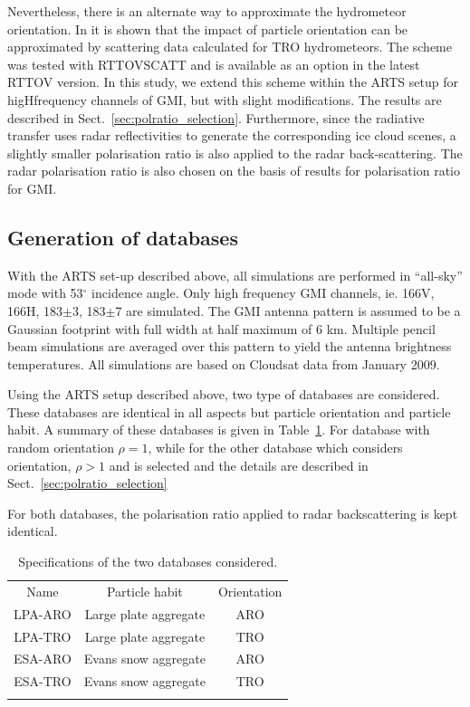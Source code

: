 \documentclass[amt, manuscript]{copernicus}
\begin{document}
Nevertheless, there is an alternate way to approximate the hydrometeor orientation. In \citet{barlakas:intro:21} it is shown that the impact of particle orientation can be approximated by scattering data calculated for TRO hydrometeors. The scheme was tested with RTTOVSCATT \citep{saunders:rttov:18} and is available as an option in the latest RTTOV version. In this study, we extend this scheme within the ARTS setup for higHfrequency channels of GMI, but with slight modifications. The results are described in Sect.~\ref{sec:polratio_selection}. Furthermore, since the radiative transfer uses radar reflectivities to generate the corresponding ice cloud scenes, a slightly smaller polarisation ratio is also applied to the radar back-scattering. The radar polarisation ratio is also chosen on the basis of results for polarisation ratio for GMI.



\subsection{Generation of databases}
\label{sec:database}

With the ARTS set-up described above, all simulations are performed in ``all-sky'' mode with 53$^{\circ}$ incidence angle. Only high frequency GMI channels, ie. 166V, 166H, 183$\pm$3, 183$\pm$7 are simulated. The GMI antenna pattern is assumed to be a Gaussian footprint with full width at half maximum of 6\,\,km. Multiple pencil beam simulations are averaged over this pattern to yield the antenna brightness temperatures. All simulations are based on Cloudsat data from January 2009.

Using the ARTS setup described above, two type of databases are considered. These databases are identical in all aspects but particle  orientation and particle habit. A summary of these databases is given in Table~\ref{tab:database_configuration}. For database with random orientation $\rho = 1$, while for the other  database which considers orientation, $\rho> 1$ and is selected and the details are described in Sect.~\ref{sec:polratio_selection}

For both databases, the polarisation ratio applied to radar backscattering is kept identical.
 
\begin{table}[t]
	\caption{Specifications of the two databases considered.}
	\label{tab:database_configuration}	
	\begin{tabular}{ccc}
		\tophline
		Name & Particle habit 	& Orientation  \\
		\middlehline
		LPA-ARO & Large plate aggregate & ARO\\
		LPA-TRO & Large plate aggregate & TRO\\
		ESA-ARO & Evans snow aggregate  & ARO\\
		ESA-TRO & Evans snow aggregate & TRO\\
		\bottomhline
	\end{tabular}
	\belowtable{} %
\end{table}
\end{document}

